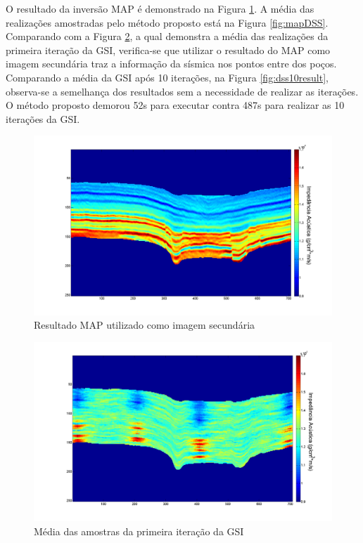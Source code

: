 O resultado da inversão MAP é demonstrado na Figura \ref{fig:mapResult}.
A média das realizações amostradas pelo método proposto está na Figura
\ref{fig:mapDSS}. Comparando com a Figura \ref{fig:dssresult}, a qual demonstra
a média das realizações da primeira iteração da GSI, verifica-se que utilizar o
resultado do MAP como imagem secundária traz a informação da sísmica nos pontos
entre dos poços. Comparando a média da GSI após 10 iterações, na Figura
\ref{fig:dss10result}, observa-se a semelhança dos resultados sem a necessidade
de realizar as iterações. O método proposto demorou 52s para executar contra
487s para realizar as 10 iterações da GSI.



\begin{figure}[htp]
\begin{center}
  \includegraphics[width=\textwidth]{fig/map}
  \caption{Resultado MAP utilizado como imagem secundária}
  \label{fig:mapResult}
\end{center}
\end{figure}


\begin{figure}[htp]
\begin{center}
  \includegraphics[width=\textwidth]{fig/dss1it-20realz}
  \caption{Média das amostras da primeira iteração da GSI}
  \label{fig:dssresult}
\end{center}
\end{figure}

